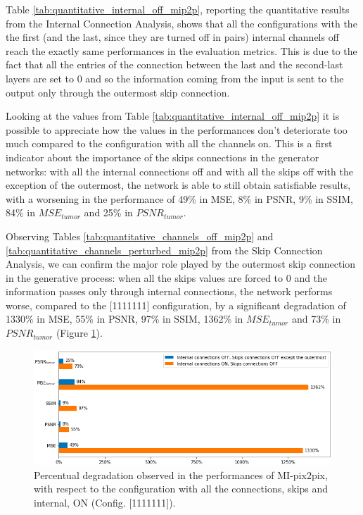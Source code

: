 \vspace{5mm}
Table \ref{tab:quantitative_internal_off_mip2p}, reporting the quantitative results from the Internal Connection Analysis, shows that all the configurations with the the first (and the last, since they are turned off in pairs) internal channels off reach the exactly same performances in the evaluation metrics. This is due to the fact that all the entries of the connection between the last and the second-last layers are set to 0 and so the information coming from the input is sent to the output only through the outermost skip connection.

\vspace{5mm}
Looking at the values from Table \ref{tab:quantitative_internal_off_mip2p} it is possible to appreciate how the values in the performances don't deteriorate too much compared to the configuration with all the channels on. This is a first indicator about the importance of the skips connections in the generator networks: with all the internal connections off and with all the skips off with the exception of the outermost, the network is able to still obtain satisfiable results, with a worsening in the performance of 49\% in MSE, 8\% in PSNR, 9\% in SSIM, 84\% in $MSE_{tumor}$ and 25\% in $PSNR_{tumor}$. 

\vspace{5mm}
Observing Tables \ref{tab:quantitative_channels_off_mip2p} and \ref{tab:quantitative_channels_perturbed_mip2p} from the Skip Connection Analysis, we can confirm the major role played by the outermost skip connection in the generative process: when all the skips values are forced to 0 and the information passes only through internal connections, the network performs worse, compared to the [1111111] configuration, by a significant degradation of 1330\% in MSE, 55\% in PSNR, 97\% in SSIM, 1362\% in $MSE_{tumor}$ and 73\% in $PSNR_{tumor}$ (Figure \ref{fig:barplot_1}).

\begin{figure}
\centering
\includegraphics[width=0.635\textheight]{images/barplot_1.pdf}
\caption[Percentual degradation in the performances of MI-pix2pix]{Percentual degradation observed in the performances of MI-pix2pix, with respect to the configuration with all the connections, skips and internal, ON (Config. [1111111]).}
\label{fig:barplot_1}
\end{figure}


